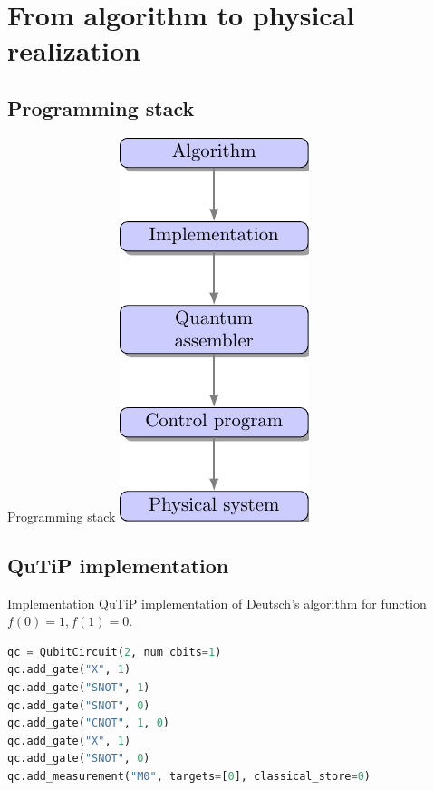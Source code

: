 
\section{From algorithm to physical realization}
\subsection{Programming stack}
\begin{frame}{Programming stack}
	\centering
	\includegraphics[scale=0.85]{pics/stack.pdf}
\end{frame}
\subsection{QuTiP implementation}
\begin{frame}[fragile]{Implementation}
	QuTiP implementation of Deutsch's algorithm for function $f(0) = 1, f(1) = 0$.

	\begin{lstlisting}[language=Python]
qc = QubitCircuit(2, num_cbits=1)
qc.add_gate("X", 1)
qc.add_gate("SNOT", 1)
qc.add_gate("SNOT", 0)
qc.add_gate("CNOT", 1, 0)
qc.add_gate("X", 1)
qc.add_gate("SNOT", 0)
qc.add_measurement("M0", targets=[0], classical_store=0)
	\end{lstlisting}
\end{frame}
